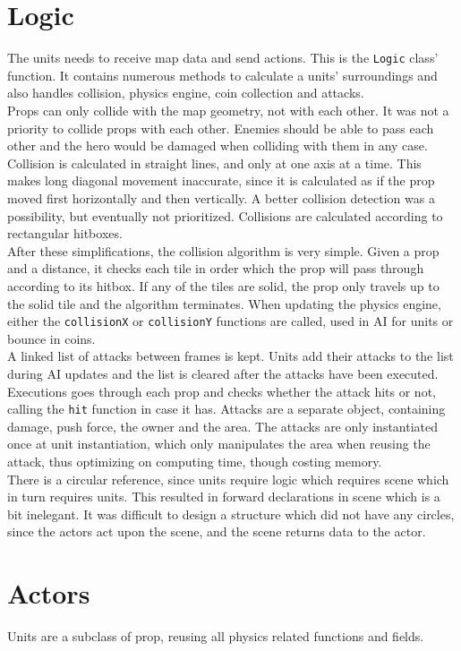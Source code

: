 \section{Logic} %
The units needs to receive map data and send actions. This is the {\tt Logic} class' function. It contains numerous methods to calculate a units' surroundings and also handles collision, physics engine, coin collection and attacks.\\
Props can only collide with the map geometry, not with each other. It was not a priority to collide props with each other. Enemies should be able to pass each other and the hero would be damaged when colliding with them in any case. Collision is calculated in straight lines, and only at one axis at a time. This makes long diagonal movement inaccurate, since it is calculated as if the prop moved first horizontally and then vertically. A better collision detection was a possibility, but eventually not prioritized. Collisions are calculated according to rectangular hitboxes.\\
After these simplifications, the collision algorithm is very simple. Given a prop and a distance, it checks each tile in order which the prop will pass through according to its hitbox. If any of the tiles are solid, the prop only travels up to the solid tile and the algorithm terminates. When updating the physics engine, either the {\tt collisionX} or {\tt collisionY} functions are called, used in AI for units or bounce in coins.\\
A linked list of attacks between frames is kept. Units add their attacks to the list during AI updates and the list is cleared after the attacks have been executed. Executions goes through each prop and checks whether the attack hits or not, calling the {\tt hit} function in case it has. Attacks are a separate object, containing damage, push force, the owner and the area. The attacks are only instantiated once at unit instantiation, which only manipulates the area when reusing the attack, thus optimizing on computing time, though costing memory.\\
There is a circular reference, since units require logic which requires scene which in turn requires units. This resulted in forward declarations in scene which is a bit inelegant. It was difficult to design a structure which did not have any circles, since the actors act upon the scene, and the scene returns data to the actor.

\section{Actors}
Units are a subclass of prop, reusing all physics related functions and fields.

